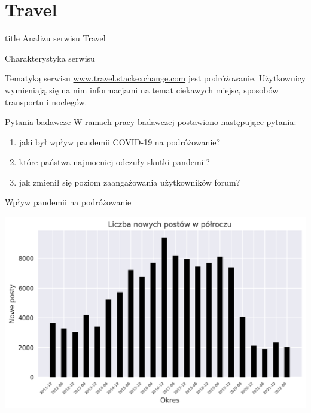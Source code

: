 \documentclass[./main.tex]{subfiles}
\begin{document}
\section{Travel}

\begin{frame}
\vfill
\centering
\begin{beamercolorbox}[sep=8pt,center,shadow=true,rounded=true]{title}
     Analizu serwisu Travel
\end{beamercolorbox}
\vfill
\end{frame}

\begin{frame}{Charakterystyka serwisu}

Tematyką serwisu \url{www.travel.stackexchange.com} jest podróżowanie. Użytkownicy wymieniają się na nim informacjami na temat ciekawych miejsc, sposobów transportu i noclegów.
    
\end{frame}

\begin{frame}{Pytania badawcze}
    W ramach pracy badawczej postawiono następujące pytania:
    \begin{enumerate}
        \item jaki był wpływ pandemii COVID-19 na podróżowanie?
        \item które państwa najmocniej odczuły skutki pandemii?
        \item jak zmienił się poziom zaangażowania użytkowników forum? 
    \end{enumerate}
\end{frame}

\begin{frame}{Wpływ pandemii na podróżowanie}
\begin{center}
    \includegraphics[width=\textwidth]{travel/new-posts.png}
\end{center}
\end{frame}
\end{document}
